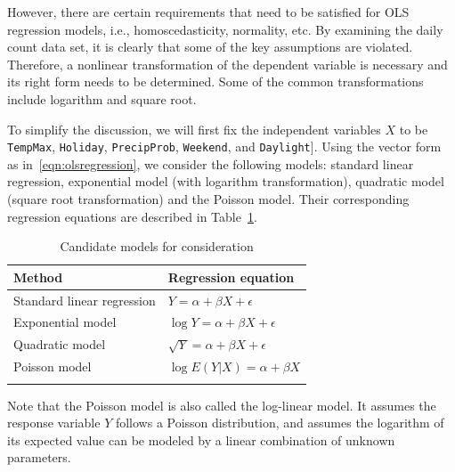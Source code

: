 \documentclass [11pt, proquest] {uwthesis}[2015/03/03]
\begin{document}
However, there are certain requirements that need to be satisfied for OLS regression models, i.e., homoscedasticity, normality, etc. By examining the daily count data set, it is clearly that some of the key assumptions are violated. Therefore, a nonlinear transformation of the dependent variable is necessary and its right form needs to be determined. Some of the common transformations include logarithm and square root.

To simplify the discussion, we will first fix the independent variables $X$ to be \texttt{TempMax}, \texttt{Holiday}, \texttt{PrecipProb}, \texttt{Weekend}, and \texttt{Daylight}]. Using the vector form as in~\eqref{eqn:olsregression}, we consider the following models: standard linear regression, exponential model (with logarithm transformation), quadratic model (square root transformation) and the Poisson model. Their corresponding regression equations are described in Table~\ref{tbl:choiceofmodel}.
\begin{table}
\begin{center}
\caption{Candidate models for consideration}
\vspace{10pt}
\begin{tabular}{l|l} 
 \hline
Method & Regression equation \\
\hline
Standard linear regression & $Y=\alpha+\beta X + \epsilon$ \\
Exponential model & $\log{Y} = \alpha + \beta X + \epsilon$ \\
Quadratic model & $\sqrt{Y} = \alpha + \beta X + \epsilon$ \\
Poisson model & $\log{E(Y|X)} = \alpha + \beta X $\\
\label{tbl:choiceofmodel}
\end{tabular}
\end{center}
\end{table}
Note that the Poisson model is also called the log-linear model. It assumes the response variable $Y$ follows a Poisson distribution, and assumes the logarithm of its expected value can be modeled by a linear combination of unknown parameters.

\end{document}
